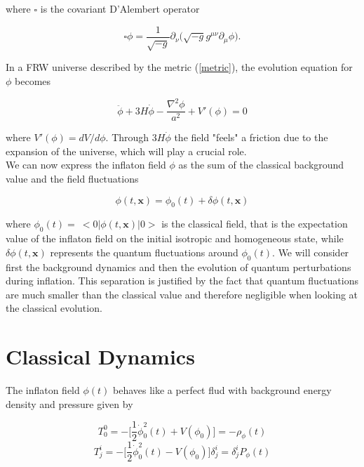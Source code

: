 \documentclass[11pt,a4paper,twoside]{book}
\begin{document}
where $\square$ is the covariant D'Alembert operator

\begin{equation}
	\label{alembertOperator}
	\square \phi = \frac{1}{\sqrt{-g}}\partial_{\nu}\Big (\sqrt{-g} g^{\mu\nu} \partial_{\mu}\phi\Big ).
\end{equation}

In a FRW universe described by the metric (\ref{metric}), the evolution equation for $ \phi $ becomes

\begin{equation}
	\label{eomForPhi}	
	\ddot{\phi} + 3H\dot{\phi} - \frac{\nabla^{2} \phi}{a^{2}} + V'(\phi)=0
\end{equation}

where $ V'(\phi)=dV/d\phi $. Through $ 3H\dot{\phi} $ the field "feels" a friction due to the expansion of the universe, which will play a crucial role.\\

We can now express the inflaton field $ \phi $ as the sum of the classical background value and the field fluctuations

\begin{equation}
	\label{splitInflaton}
	\phi(t,\textbf{x})=\phi_{0}(t) + \delta \phi(t,\textbf{x})
\end{equation}

where $\phi_{0}(t) =\ <0|\phi(t,\textbf{x})|0> $  is the classical field, that is the expectation value of the inflaton field on the initial isotropic and homogeneous state, while $\delta \phi (t,\textbf{x})$ represents the quantum fluctuations around $ \phi_{0}(t)$.
We will consider first the background dynamics and then the evolution of quantum perturbations during inflation. This separation is justified by the fact that quantum fluctuations are much smaller than the classical value and therefore negligible when looking at the classical evolution.

\section{Classical Dynamics}
The inflaton field $ \phi(t) $  behaves like a perfect flud with background energy density and pressure given by 

\begin{equation}
	\label{energyDensityPressure}
	T^{0}_{0} = -\Big [\dfrac{1}{2} \dot{\phi}^{2}_{0}(t) + V(\phi_{0}) \Big ] = -\rho_{\phi}(t)
\end{equation}
\begin{equation*}
	T^{i}_{j} = -\Big [\dfrac{1}{2} \dot{\phi}^{2}_{0}(t) - V(\phi_{0}) \Big ]\delta^{i}_{j} = \delta^{i}_{j} P_{\phi} (t)	
\end{equation*}
\end{document}
